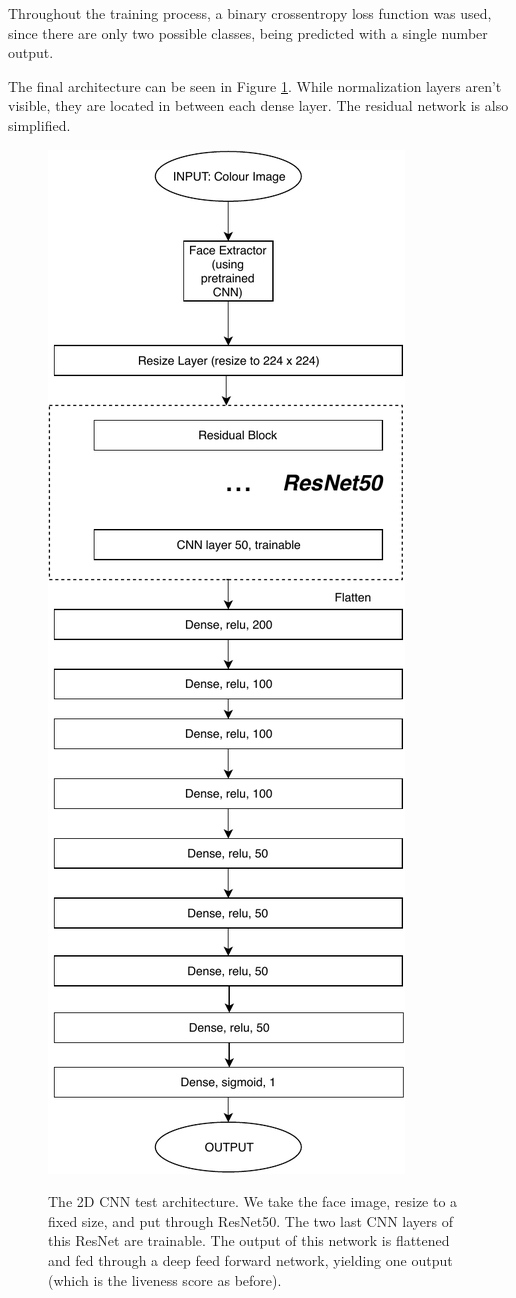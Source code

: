 \documentclass[10pt,a4paper]{article}
\begin{document}
        Throughout the training process, a binary crossentropy loss function was used, since there are only two possible classes, being predicted with a single number output. 

        The final architecture can be seen in Figure \ref{2DCNNArchitecture}. While normalization layers aren't visible, they are located in between each dense layer. The residual network
        is also simplified.

        \begin{figure}
            \centering
            \includegraphics[width=0.6\linewidth]{2DCNNArchitecture.pdf}
            \label{2DCNNArchitecture}
            \caption{The 2D CNN test architecture. We take the face image, resize to a fixed size, and put through ResNet50. The two last CNN layers
            of this ResNet are trainable. The output of this network is flattened and fed through a deep feed forward network, yielding one output (which is the
            liveness score as before).}
        \end{figure}
\end{document}
